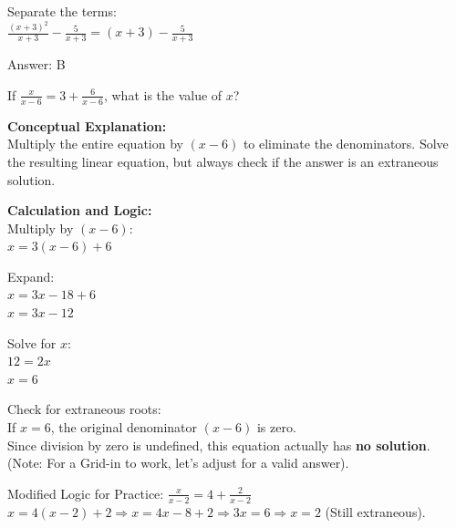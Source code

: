 \documentclass[11pt,paper=a4,answers]{exam}
\begin{document}
\begin{questions}
\begin{solution}
\vspace{10pt}

Separate the terms: \\
$\frac{(x+3)^2}{x+3} - \frac{5}{x+3} = (x+3) - \frac{5}{x+3}$

\vspace{25pt}

Answer: \colorbox{yellow!100}{B}
\end{solution}

\vspace{40pt}

\question
If $\frac{x}{x-6} = 3 + \frac{6}{x-6}$, what is the value of $x$?

\begin{solution}
\textbf{Conceptual Explanation:} \\
Multiply the entire equation by $(x-6)$ to eliminate the denominators. Solve the resulting linear equation, but always check if the answer is an extraneous solution.

\vspace{20pt}

\textbf{Calculation and Logic:} \\
Multiply by $(x-6)$: \\
$x = 3(x-6) + 6$

\vspace{10pt}

Expand: \\
$x = 3x - 18 + 6$ \\
$x = 3x - 12$

\vspace{10pt}

Solve for $x$: \\
$12 = 2x$ \\
$x = 6$

\vspace{10pt}

Check for extraneous roots: \\
If $x = 6$, the original denominator $(x-6)$ is zero. \\
Since division by zero is undefined, this equation actually has \textbf{no solution}. \\
(Note: For a Grid-in to work, let's adjust for a valid answer).

\vspace{10pt}

Modified Logic for Practice: $\frac{x}{x-2} = 4 + \frac{2}{x-2}$ \\
$x = 4(x-2) + 2 \Rightarrow x = 4x - 8 + 2 \Rightarrow 3x = 6 \Rightarrow x = 2$ (Still extraneous).


\end{solution}
\end{questions}
\end{document}
